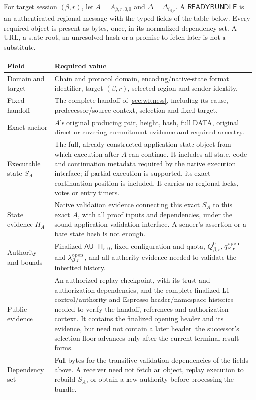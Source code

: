 \documentclass[11pt,a4paper]{article}
\newcommand{\tagg}[1]{\ensuremath{\mathsf{#1}}}
\newcounter{protocol}
\begin{document}
For target session $(\beta,r)$, let $A=A_{\beta,r,0,0}$ and
$\Delta=\Delta_{i_{\beta,r}}$. A \tagg{READYBUNDLE} is an authenticated
regional message with the typed fields of the table below. Every required
object is present as bytes, once, in its normalized dependency set. A
URL, a state root, an unresolved hash or a promise to fetch later is not
a substitute.
\begin{table}[htbp]\centering\small
\begin{tabularx}{\linewidth}{@{}>{\raggedright\arraybackslash}p{.25\linewidth}Y@{}}\toprule
Field & Required value\\\midrule
Domain and target & Chain and protocol domain, encoding/native-state
format identifier, target $(\beta,r)$, selected region and sender identity.\\
Fixed handoff & The complete handoff of \cref{sec:witness}, including
its cause, predecessor/source context, selection and fixed target.\\
Exact anchor & $A$'s original producing pair, height, hash, full DATA,
original direct or covering commitment evidence and required ancestry.\\
Executable state $S_A$ & The full, already constructed application-state
object from which execution after $A$ can continue. It includes all state,
code and continuation metadata required by the native execution interface;
if partial execution is supported, its exact continuation position is
included. It carries no regional locks, votes or entry timers.\\
State evidence $\Pi_A$ & Native validation evidence connecting this exact
$S_A$ to this exact $A$, with all proof inputs and dependencies, under the
sound application-validation interface. A sender's assertion or a bare
state hash is not enough.\\
Authority and bounds & Finalized $\tagg{AUTH}_{r,0}$, fixed configuration
and quota, $Q^0_{\beta,r}$, $q^{\rm open}_{\beta,r}$ and
$\lambda^{\rm open}_{\beta,r}$, and all authority evidence needed to
validate the inherited history.\\
Public evidence & An authorized replay checkpoint, with its trust and
authorization dependencies, and the complete finalized L1
control/authority and Espresso header/namespace histories needed to
verify the handoff, references and authorization context. It contains the
finalized opening header and its evidence, but need not contain a later
header: the successor's selection floor advances only after the current
terminal result forms.\\
Dependency set & Full bytes for the transitive validation dependencies
of the fields above. A receiver need not fetch an object, replay
execution to rebuild $S_A$, or obtain a new authority before processing
the bundle.\\\bottomrule
\end{tabularx}
\end{table}
\end{document}
